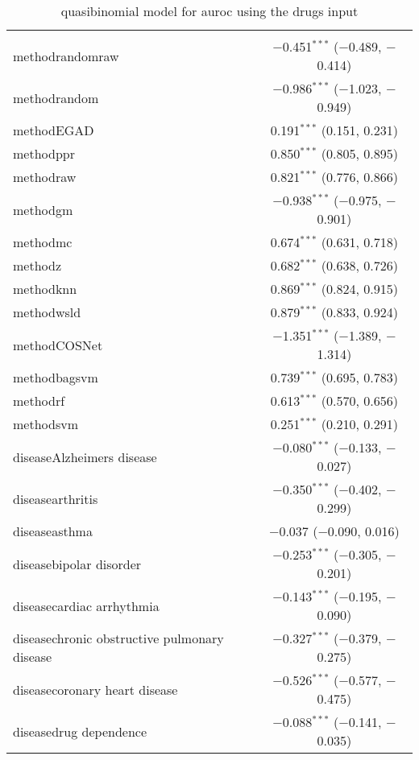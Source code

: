 
\begin{table}[!htbp] \centering 
  \caption{quasibinomial model for auroc using the drugs input} 
  \label{} 
\begin{tabular}{@{\extracolsep{5pt}}lc} 
\\[-1.8ex]\hline 
\hline \\[-1.8ex] 
 methodrandomraw & $-$0.451$^{***}$ ($-$0.489, $-$0.414) \\ 
  methodrandom & $-$0.986$^{***}$ ($-$1.023, $-$0.949) \\ 
  methodEGAD & 0.191$^{***}$ (0.151, 0.231) \\ 
  methodppr & 0.850$^{***}$ (0.805, 0.895) \\ 
  methodraw & 0.821$^{***}$ (0.776, 0.866) \\ 
  methodgm & $-$0.938$^{***}$ ($-$0.975, $-$0.901) \\ 
  methodmc & 0.674$^{***}$ (0.631, 0.718) \\ 
  methodz & 0.682$^{***}$ (0.638, 0.726) \\ 
  methodknn & 0.869$^{***}$ (0.824, 0.915) \\ 
  methodwsld & 0.879$^{***}$ (0.833, 0.924) \\ 
  methodCOSNet & $-$1.351$^{***}$ ($-$1.389, $-$1.314) \\ 
  methodbagsvm & 0.739$^{***}$ (0.695, 0.783) \\ 
  methodrf & 0.613$^{***}$ (0.570, 0.656) \\ 
  methodsvm & 0.251$^{***}$ (0.210, 0.291) \\ 
  diseaseAlzheimers disease & $-$0.080$^{***}$ ($-$0.133, $-$0.027) \\ 
  diseasearthritis & $-$0.350$^{***}$ ($-$0.402, $-$0.299) \\ 
  diseaseasthma & $-$0.037 ($-$0.090, 0.016) \\ 
  diseasebipolar disorder & $-$0.253$^{***}$ ($-$0.305, $-$0.201) \\ 
  diseasecardiac arrhythmia & $-$0.143$^{***}$ ($-$0.195, $-$0.090) \\ 
  diseasechronic obstructive pulmonary disease & $-$0.327$^{***}$ ($-$0.379, $-$0.275) \\ 
  diseasecoronary heart disease & $-$0.526$^{***}$ ($-$0.577, $-$0.475) \\ 
  diseasedrug dependence & $-$0.088$^{***}$ ($-$0.141, $-$0.035) \\ 

\end{tabular}
\end{table}
